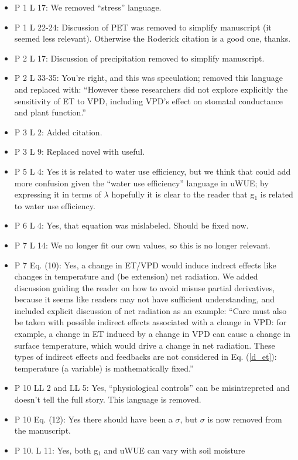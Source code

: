 \documentclass[12pt]{article}
\begin{document}
\begin{itemize}
\item P 1 L 17: We removed ``stress'' language.
\item P 1 L 22-24: Discussion of PET was removed to simplify
  manuscript (it seemed less relevant). Otherwise the Roderick
  citation is a good one, thanks.
\item P 2 L 17: Discussion of precipitation removed to simplify
  manuscript.
\item P 2 L 33-35: You're right, and this was speculation; removed
  this language and replaced with: ``However these researchers did not
  explore explicitly the sensitivity of ET to VPD, including VPD's
  effect on stomatal conductance and plant function.''
\item P 3 L 2: Added citation.
\item P 3 L 9: Replaced novel with useful.
\item P 5 L 4: Yes it is related to water use efficiency, but we think
  that could add more confusion given the ``water use efficiency''
  language in uWUE; by expressing it in terms of $\lambda$ hopefully
  it is clear to the reader that g$_1$ is related to water use
  efficiency.
\item P 6 L 4: Yes, that equation was mislabeled. Should be fixed now.
\item P 7 L 14: We no longer fit our own values, so this is no
  longer relevant.
\item P 7 Eq. (10): Yes, a change in ET/VPD would induce indrect
  effects like changes in temperature and (be extension) net
  radiation. We added discussion guiding the reader on how to avoid
  misuse partial derivatives, because it seems like readers may not
  have sufficient understanding, and included explicit discussion of
  net radiation as an example: ``Care must also be taken with possible
  indirect effects associated with a change in VPD: for example, a
  change in ET induced by a change in VPD can cause a change in
  surface temperature, which would drive a change in net
  radiation. These types of indirect effects and feedbacks are not
  considered in Eq. (\ref{d_et}): temperature (a variable) is
  mathematically fixed.''
\item P 10 LL 2 and LL 5: Yes, ``physiological controls'' can be
  misintrepreted and doesn't tell the full story. This language is
  removed.
\item P 10 Eq. (12): Yes there should have been a $\sigma$, but
  $\sigma$ is now removed from the manuscript.
\item P 10. L 11: Yes, both g$_1$ and uWUE can vary with soil moisture

\end{itemize}
\end{document}

